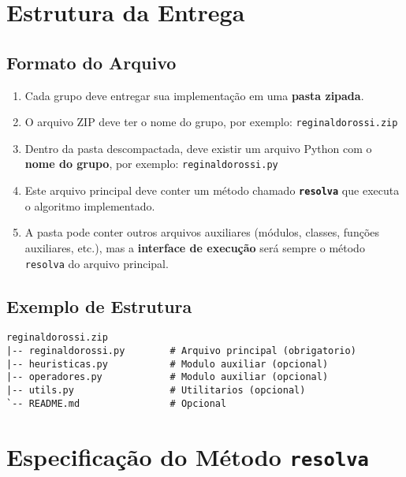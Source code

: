 \documentclass[12pt,a4paper]{article}
\begin{document}
\section{Estrutura da Entrega}

\subsection{Formato do Arquivo}

\begin{enumerate}[label=\arabic*.]
    \item Cada grupo deve entregar sua implementação em uma \textbf{pasta zipada}.
    
    \item O arquivo ZIP deve ter o nome do grupo, por exemplo: \texttt{reginaldorossi.zip}

    \item Dentro da pasta descompactada, deve existir um arquivo Python com o \textbf{nome do grupo}, por exemplo: \texttt{reginaldorossi.py}

    \item Este arquivo principal deve conter um método chamado \texttt{\textbf{resolva}} que executa o algoritmo implementado.
    
    \item A pasta pode conter outros arquivos auxiliares (módulos, classes, funções auxiliares, etc.), mas a \textbf{interface de execução} será sempre o método \texttt{resolva} do arquivo principal.
\end{enumerate}

\subsection{Exemplo de Estrutura}

\begin{tcolorbox}[colback=blue!5!white,colframe=blue!75!black,title=Estrutura de Diretórios]
\begin{verbatim}
reginaldorossi.zip
|-- reginaldorossi.py        # Arquivo principal (obrigatorio)
|-- heuristicas.py           # Modulo auxiliar (opcional)
|-- operadores.py            # Modulo auxiliar (opcional)
|-- utils.py                 # Utilitarios (opcional)
`-- README.md                # Opcional
\end{verbatim}
\end{tcolorbox}

\section{Especificação do Método \texttt{resolva}}
\end{document}
